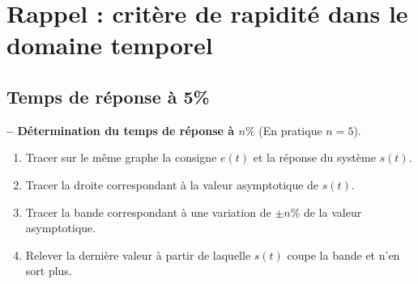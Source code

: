 \def\xxactivite{Cours}
\def\xxauteur{\textsl{Xavier Pessoles}}


\def\xxnumchapitre{Chapitre 5 \vspace{.2cm}}
\def\xxchapitre{\hspace{.12cm} Rapidité des systèmes}

\def\xxcompetences{%
\textsl{%
\textbf{Savoirs et compétences :}\\
}}


\def\xxfigures{
}%



\setlength{\columnseprule}{.1pt}

\vspace{2cm}
\pagestyle{fancy}


\section{Rappel : critère de rapidité dans le domaine temporel}

\subsection{Temps de réponse à 5\%}

\begin{methode}
\textbf{ -- Détermination du temps de réponse à $n\%$} (En pratique $n=5$).\\

\begin{enumerate}
\item Tracer sur le même graphe la consigne $e(t)$ et la réponse du système
$s(t)$.
\item Tracer la droite correspondant à la valeur asymptotique de $s(t)$.
\item Tracer la bande correspondant à une variation de $\pm n\%$ de la valeur
asymptotique.
\item Relever la dernière valeur à partir de laquelle $s(t)$ coupe la bande et
n'en sort plus.
\end{enumerate}
\end{methode}

